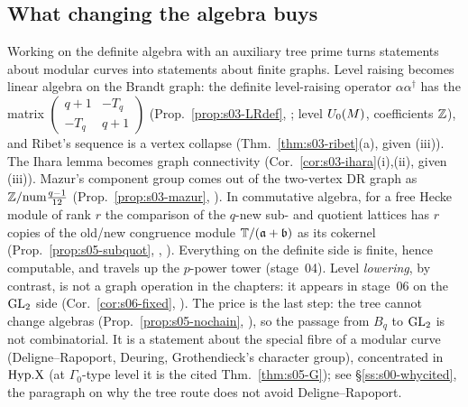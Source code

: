 \subsection*{What changing the algebra buys}
Working on the definite algebra with an auxiliary tree prime turns statements about modular curves into statements about
finite graphs. Level raising becomes linear algebra on the Brandt graph: the definite level-raising operator
$\alpha\alpha^\dagger$ has the matrix $\left(\begin{smallmatrix}q+1&-T_q\\-T_q&q+1\end{smallmatrix}\right)$
(Prop.~\ref{prop:s03-LRdef}, \stproved; level $U_0(M)$, coefficients $\mathbb{Z}$), and Ribet's sequence is a vertex collapse (Thm.~\ref{thm:s03-ribet}(a), \stproved{} given
(iii)). The Ihara lemma becomes graph connectivity (Cor.~\ref{cor:s03-ihara}(i),(ii), \stproved{} given (iii)). Mazur's component
group comes out of the two-vertex DR graph as $\mathbb{Z}/\mathrm{num}\frac{q-1}{12}$ (Prop.~\ref{prop:s03-mazur}, \stpmc). In commutative algebra, for a free Hecke module of rank $r$ the comparison of the $q$-new
sub- and quotient lattices has $r$ copies of the old/new congruence module $\mathbb{T}/(\mathfrak{a}+\mathfrak{b})$ as its cokernel
(Prop.~\ref{prop:s05-subquot}, \stproved, \stformal). Everything on the definite side is finite, hence computable, and travels up the $p$-power tower (stage~04). Level \emph{lowering}, by
contrast, is not a graph operation in the chapters: it appears in stage~06 on the $\mathrm{GL}_2$ side (Cor.~\ref{cor:s06-fixed},
\stpmc). The price is the last step: the tree cannot change algebras (Prop.~\ref{prop:s05-nochain}, \stproved), so the passage
from $B_q$ to $\mathrm{GL}_2$ is not combinatorial. It is a statement about the special fibre of a modular curve (Deligne--Rapoport,
Deuring, Grothendieck's character group), concentrated in $\mathrm{Hyp.X}$ (at $\Gamma_0$-type level it is the cited Thm.~\ref{thm:s05-G}); see \S\ref{ss:s00-whycited}, the paragraph on why the tree
route does not avoid Deligne--Rapoport.
